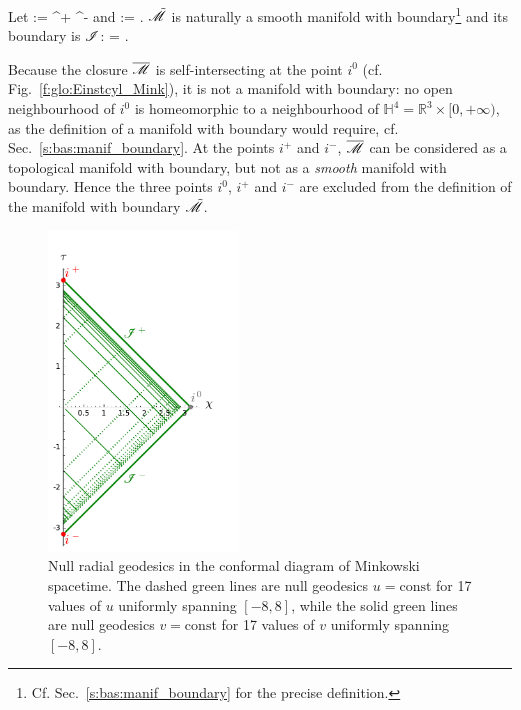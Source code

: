 Let
\be
    \scri := \scri^+ \cup \scri^-
\ee
and
\be
    \tilde{\M} := \M \cup \scri .
\ee
$\tilde{\mathscr{M}}$ is naturally a smooth manifold with
boundary\footnote{Cf. Sec.~\ref{s:bas:manif_boundary} for the precise definition.}
and its boundary is $\mathscr{I}$:
\be
    \partial \tilde{\M} = \scri.
\ee
\begin{remark}
Because the closure $\overline{\mathscr{M}}$ is self-intersecting at the point $i^0$
(cf. Fig.~\ref{f:glo:Einstcyl_Mink}), it is not a manifold with boundary: no open neighbourhood of
$i^0$ is homeomorphic to a neighbourhood of
$\mathbb{H}^4 = \mathbb{R}^3\times [0,+\infty)$,
as the definition of a manifold with boundary would
require, cf. Sec.~\ref{s:bas:manif_boundary}.
At the points $i^+$ and $i^-$, $\overline{\mathscr{M}}$ can be considered as a
topological manifold with boundary, but not as a \emph{smooth} manifold with boundary.
Hence the three points $i^0$, $i^+$ and $i^-$ are excluded from the definition
of the manifold with boundary $\tilde{\mathscr{M}}$.
\end{remark}

\begin{figure}
\centerline{\includegraphics[width=0.45\textwidth]{glo_conf_Mink_null.pdf}}
\caption[]{\label{f:glo:conf_Mink_null}\footnotesize
Null radial geodesics in the conformal diagram of Minkowski spacetime.
The dashed green lines are null geodesics $u=\mathrm{const}$ for
17 values of $u$ uniformly spanning $[-8,8]$, while the solid green lines are
null geodesics $v=\mathrm{const}$ for 17 values of $v$ uniformly spanning $[-8,8]$.}
\end{figure}

